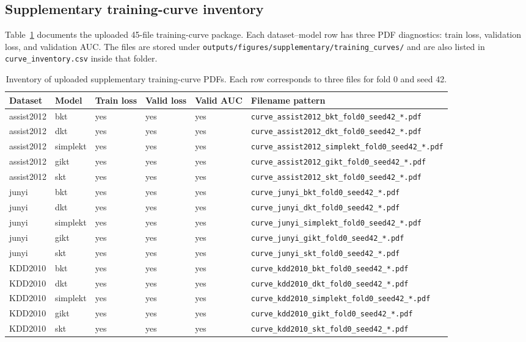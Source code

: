 \documentclass[11pt,a4paper]{article}
\begin{document}
\subsection{Supplementary training-curve inventory}
\label{app:curve-inventory}
Table~\ref{tab:curve-inventory} documents the uploaded 45-file training-curve package. Each dataset--model row has three PDF diagnostics: train loss, validation loss, and validation AUC. The files are stored under \texttt{outputs/figures/supplementary/training\_curves/} and are also listed in \texttt{curve\_inventory.csv} inside that folder.

\begin{table}[H]
\centering
\caption{Inventory of uploaded supplementary training-curve PDFs. Each row corresponds to three files for fold 0 and seed 42.}
\label{tab:curve-inventory}
\scriptsize
\begin{adjustbox}{max width=\textwidth}
\begin{tabular}{llllll}
\toprule
Dataset & Model & Train loss & Valid loss & Valid AUC & Filename pattern \\
\midrule
assist2012 & bkt & yes & yes & yes & \texttt{curve\_assist2012\_bkt\_fold0\_seed42\_*.pdf} \\
assist2012 & dkt & yes & yes & yes & \texttt{curve\_assist2012\_dkt\_fold0\_seed42\_*.pdf} \\
assist2012 & simplekt & yes & yes & yes & \texttt{curve\_assist2012\_simplekt\_fold0\_seed42\_*.pdf} \\
assist2012 & gikt & yes & yes & yes & \texttt{curve\_assist2012\_gikt\_fold0\_seed42\_*.pdf} \\
assist2012 & skt & yes & yes & yes & \texttt{curve\_assist2012\_skt\_fold0\_seed42\_*.pdf} \\
junyi & bkt & yes & yes & yes & \texttt{curve\_junyi\_bkt\_fold0\_seed42\_*.pdf} \\
junyi & dkt & yes & yes & yes & \texttt{curve\_junyi\_dkt\_fold0\_seed42\_*.pdf} \\
junyi & simplekt & yes & yes & yes & \texttt{curve\_junyi\_simplekt\_fold0\_seed42\_*.pdf} \\
junyi & gikt & yes & yes & yes & \texttt{curve\_junyi\_gikt\_fold0\_seed42\_*.pdf} \\
junyi & skt & yes & yes & yes & \texttt{curve\_junyi\_skt\_fold0\_seed42\_*.pdf} \\
KDD2010 & bkt & yes & yes & yes & \texttt{curve\_kdd2010\_bkt\_fold0\_seed42\_*.pdf} \\
KDD2010 & dkt & yes & yes & yes & \texttt{curve\_kdd2010\_dkt\_fold0\_seed42\_*.pdf} \\
KDD2010 & simplekt & yes & yes & yes & \texttt{curve\_kdd2010\_simplekt\_fold0\_seed42\_*.pdf} \\
KDD2010 & gikt & yes & yes & yes & \texttt{curve\_kdd2010\_gikt\_fold0\_seed42\_*.pdf} \\
KDD2010 & skt & yes & yes & yes & \texttt{curve\_kdd2010\_skt\_fold0\_seed42\_*.pdf} \\
\bottomrule
\end{tabular}
\end{adjustbox}
\end{table}
\end{document}

